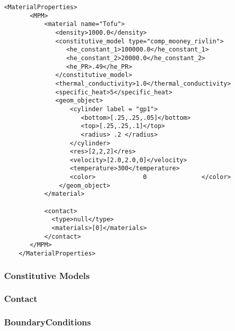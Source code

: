 \begin{Verbatim}[fontsize=\footnotesize]
    <MaterialProperties>
       <MPM>
           <material name="Tofu">
              <density>1000.0</density>
              <constitutive_model type="comp_mooney_rivlin">
                 <he_constant_1>100000.0</he_constant_1>
                 <he_constant_2>20000.0</he_constant_2>
                 <he_PR>.49</he_PR>
              </constitutive_model>
              <thermal_conductivity>1.0</thermal_conductivity>
              <specific_heat>5</specific_heat>
              <geom_object>
                  <cylinder label = "gp1">
                     <bottom>[.25,.25,.05]</bottom>
                     <top>[.25,.25,.1]</top>
                     <radius> .2 </radius>
                  </cylinder>
                  <res>[2,2,2]</res>
                  <velocity>[2.0,2.0,0]</velocity>
                  <temperature>300</temperature>
                  <color>             0               </color>
               </geom_object>
           </material>

           <contact>
             <type>null</type>
             <materials>[0]</materials>
           </contact>
       </MPM>
    </MaterialProperties>
\end{Verbatim}

\subsubsection{Constitutive Models} \label{ConstitutiveModels}
\subsubsection{Contact}  \label{Contact}
\subsubsection{BoundaryConditions} \label{Sec:MPM_BCs}

